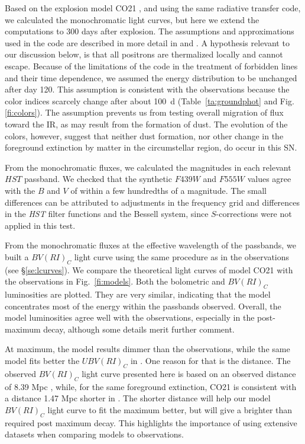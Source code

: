 \documentclass[12pt,manuscript]{aastex}
\begin{document}
Based on the explosion model CO21 \citep{ietal94},
and using the same radiative transfer code,
we calculated the monochromatic light curves, but
here we extend the computations to 300 days after
explosion.  
%
The assumptions and approximations used in the code
are described in more detail in \citep{ietal94}
and  \citep{hetal93}.
%
A hypothesis relevant to our discussion below,
is that all positrons are thermalized locally
and cannot escape.
%
Because of the limitations of the code 
in the treatment of forbidden lines and their time dependence, 
we assumed the energy distribution to be unchanged after day 
120.
%
This assumption is consistent with the observations 
because the color indices scarcely change after about 100~d 
(Table~\ref{ta:groundphot} and Fig. \ref{fi:colors}).
%
The assumption prevents us from testing overall migration
of flux toward the IR, as may result from the formation of dust.
%
The evolution of the colors, however, suggest that neither
dust formation, nor other change in the foreground extinction
by matter in the circumstellar region, do occur in this SN.

From the monochromatic fluxes, we calculated the magnitudes
in each relevant $HST$ passband.
%
We checked that the synthetic $F439W$ and $F555W$ values agree
with the $B$ and $V$ of \citet{ietal94} within a few hundredths
of a magnitude.
%
The small differences can be attributed to adjustments in 
the frequency grid and differences in the {\em HST} filter 
functions and the Bessell system, since $S$-corrections were
not applied in this test.

From the monochromatic fluxes at the effective wavelength of
the passbands, we built a $BV(RI)_C$ light curve using the same
procedure as in the observations (see \S \ref{se:lcurves}).
%
We compare the theoretical light curves of model CO21 with 
the observations in Fig.~\ref{fi:models}.
%
Both the bolometric and $BV(RI)_C$ luminosities are plotted.
%
They are very similar, indicating that the model concentrates 
most of the energy within the passbands observed.
%
Overall, the model luminosities agree well with the observations, 
especially in the post-maximum decay, although some details
merit further comment.


At maximum, the model results dimmer than the observations, while
the same model fits better the $UBV(RI)_C$ in \citet{ietal94}.
%
One reason for that is the distance.
%
The observed $BV(RI)_C$ light curve presented here is based on an
observed distance of 8.39 Mpc \citep{fcj97}, while, for the same
foreground extinction,
CO21 is consistent with a distance 1.47 Mpc shorter in \citet{ietal94}.
%
The shorter distance will help our model $BV(RI)_C$ light curve to fit
the maximum better, but will give a brighter than required post maximum
decay.
%
This highlights the importance of using extensive datasets when comparing
models to observations.
\end{document}
